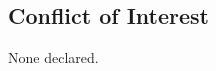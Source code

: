 \documentclass[10pt,twocolumn]{article}
\begin{document}
\subsection*{Conflict of Interest} 
None declared.
















\end{document}
